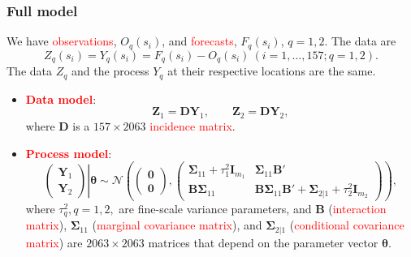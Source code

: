 \documentclass{beamer}
\newcommand{\Bmat} {\textbf{B}}
\newcommand{\Dmat} {\textbf{D}}
\newcommand{\Imat} {\textbf{I}}
\newcommand{\Yvec}{\mathbf{Y}}
\newcommand{\Zvec}{\mathbf{Z}}
\newcommand{\thetab}{\boldsymbol{\theta}}
\newcommand{\bzero}{\boldsymbol{0}}
\newcommand{\bSigma}{\bm{\Sigma}}
\newcommand{\red}{\textcolor{red}}%
\begin{document}

\begin{frame}
\frametitle{Full model}

We have \red{observations}, $O_q(s_i)$, and \red{forecasts}, $F_q(s_i)$, $q = 1,2$. The data are 
$$Z_q(s_i)=Y_q(s_i)=F_q(s_i)-O_q(s_i)~(i =1,\dots,157; q = 1,2).$$ 
The data $Z_q$ and the process $Y_q$ at their respective locations are the same. 

\begin{itemize}
\item \textcolor{red}{\textbf{Data model}}:
\begin{equation*}
\Zvec_1 = \Dmat\Yvec_1, \qquad \Zvec_2 = \Dmat\Yvec_2,
\end{equation*}
where $\Dmat$ is a $157\times 2063$ \textcolor{red}{incidence matrix}.
\item \textcolor{red}{\textbf{Process model}}:
\begin{equation*}
\left.\begin{pmatrix} \Yvec_1 \\ \Yvec_2 \end{pmatrix}\right| \thetab \sim \mathcal{N}
\left(
\begin{pmatrix} \bzero \\ \bzero \end{pmatrix},
\begin{pmatrix}
\bSigma_{11} + \tau_1^2\Imat_{m_1} & \bSigma_{11}\Bmat' \\
\Bmat \bSigma_{11} & \Bmat \bSigma_{11}\Bmat' + \bSigma_{2|1} + \tau_2^2\Imat_{m_2}
\end{pmatrix}
\right),
\end{equation*}
\noindent where $\tau_q^2, q=1,2,$ are fine-scale variance parameters, and $\mathbf{B}$ (\textcolor{red}{interaction matrix}), $\bSigma_{11}$ (\textcolor{red}{marginal covariance matrix}), and $\bSigma_{2|1}$ (\textcolor{red}{conditional covariance matrix}) are $2063\times 2063$ matrices that depend on the parameter vector $\thetab$.
\end{itemize}
\end{frame}

\end{document}
